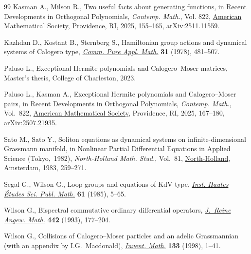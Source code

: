 \begin{thebibliography}{99}
Kasman A., Milson R., Two useful facts about generating functions, in Recent
 {D}evelopments in {O}rthogonal {P}olynomials, \textit{Contemp. Math.}, Vol.
 822, \href{https://doi.org/10.1090/conm/822/16476}{American Mathematical
 Society}, Providence, RI, 2025, 155--165,
 \href{http://arxiv.org/abs/2511.11559}{arXiv:2511.11559}.

Kazhdan D., Kostant B., Sternberg S., Hamiltonian group actions and dynamical
 systems of {C}alogero type,
 \href{https://doi.org/10.1002/cpa.3160310405}{\textit{Comm. Pure Appl.
 Math.}} \textbf{31} (1978), 481--507.

Paluso L., Exceptional {H}ermite polynomials and {C}alogero--{M}oser matrices,
 {M}aster's thesis, {C}ollege of Charleston, 2023.

Paluso L., Kasman A., Exceptional {H}ermite polynomials and {C}alogero--{M}oser
 pairs, in Recent {D}evelopments in {O}rthogonal {P}olynomials,
 \textit{Contemp. Math.}, Vol.~822,
 \href{https://doi.org/10.1090/conm/822/16481}{American Mathematical Society},
 Providence, RI, 2025, 167--180,
 \href{http://arxiv.org/abs/2507.21935}{arXiv:2507.21935}.

Sato M., Sato Y., Soliton equations as dynamical systems on
 infinite-dimensional {G}rassmann manifold, in Nonlinear {P}artial
 {D}ifferential {E}quations in {A}pplied {S}cience ({T}okyo,~1982),
 \textit{North-Holland Math. Stud.}, Vol.~81,
 \href{https://doi.org/10.1016/S0304-0208(08)72096-6}{North-Holland},
 Amsterdam, 1983, 259--271.

Segal G., Wilson G., Loop groups and equations of {K}d{V} type,
 \href{https://doi.org/10.1007/BF02698802}{\textit{Inst. Hautes \'{E}tudes
 Sci. Publ. Math.}} \textbf{61} (1985), 5--65.

Wilson G., Bispectral commutative ordinary differential operators,
 \href{https://doi.org/10.1515/crll.1993.442.177}{\textit{J.~Reine Angew.
 Math.}} \textbf{442} (1993), 177--204.

Wilson G., Collisions of {C}alogero--{M}oser particles and an adelic
 {G}rassmannian (with an appendix by I.G.~Macdonald),
 \href{https://doi.org/10.1007/s002220050237}{\textit{Invent. Math.}}
 \textbf{133} (1998), 1--41.

\end{thebibliography}
